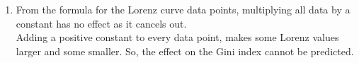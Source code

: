 \begin{enumerate}
\begin{figure}[H]
\begin{tikzpicture}
		\end{tikzpicture}
	\end{figure} 
	
	\item From the formula for the Lorenz curve data points, multiplying all data by a constant has no effect as it cancels out. \\
	Adding a positive constant to every data point, makes some Lorenz values larger and some smaller. So, the effect on the Gini index cannot be predicted. \\
	
\end{enumerate}

